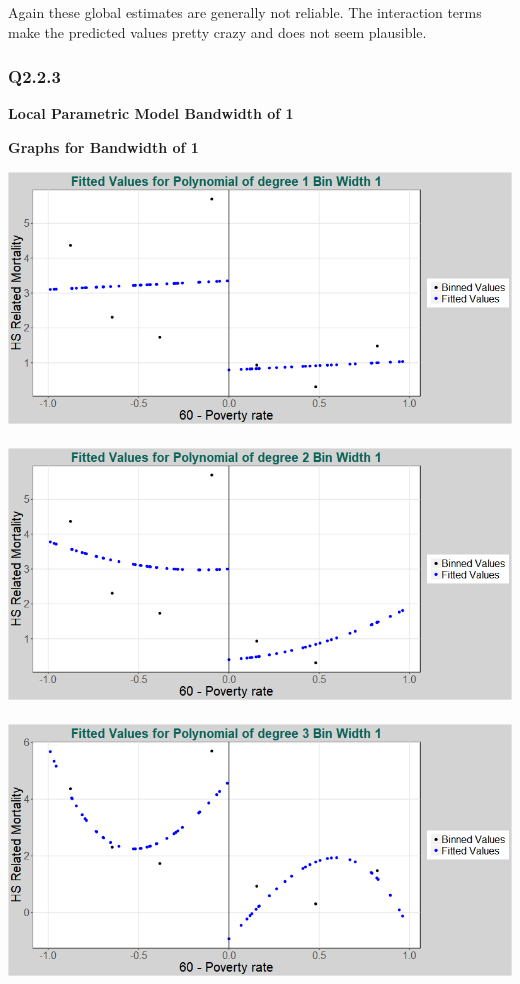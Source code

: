 \documentclass[11pt]{article}
\begin{document}
Again these global estimates are generally not reliable. The interaction terms make the predicted values pretty crazy and does not seem plausible. 


\subsubsection{Q2.2.3}

\begin{center}
	\centering
	\textbf{Local Parametric Model Bandwidth of 1 }\par\medskip
	\scalebox{1}{
		
	}
\end{center}

\begin{center}
	{\large \bf{Graphs for Bandwidth of 1}}
\end{center}

\includegraphics[width=.8\linewidth]{plot_223_poly_1_bw_1.png}
\\ \\
\includegraphics[width=.8\linewidth]{plot_223_poly_2_bw_1.png}
\\ \\
\includegraphics[width=.8\linewidth]{plot_223_poly_3_bw_1.png}
\end{document}
